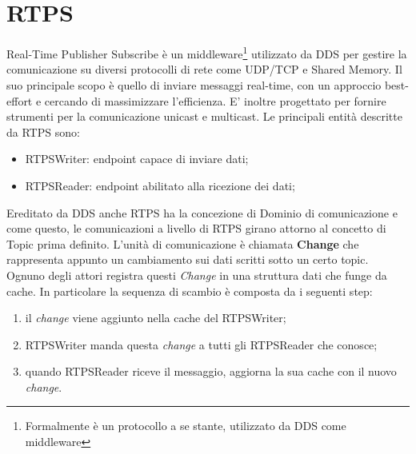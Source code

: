 \section{RTPS}\label{sec:rtps}
Real-Time Publisher Subscribe è un middleware\footnote{Formalmente è un protocollo a se stante, utilizzato da DDS come middleware} utilizzato da DDS per gestire la comunicazione su diversi protocolli di rete come UDP/TCP e Shared Memory. Il suo principale scopo è quello di inviare messaggi real-time, con un approccio best-effort e cercando di massimizzare l'efficienza. E' inoltre progettato per fornire strumenti per la comunicazione unicast e multicast. Le principali entità descritte da RTPS sono:
\begin{itemize}
    \item RTPSWriter: endpoint capace di inviare dati;
    \item RTPSReader: endpoint abilitato alla ricezione dei dati;
\end{itemize}
Ereditato da DDS anche RTPS ha la concezione di Dominio di comunicazione e come questo, le comunicazioni a livello di RTPS girano attorno al concetto di Topic prima definito. L'unità di comunicazione è chiamata \textbf{Change} che rappresenta appunto un cambiamento sui dati scritti sotto un certo topic. Ognuno degli attori registra questi \emph{Change} in una struttura dati che funge da cache.
In particolare la sequenza di scambio è composta da i seguenti step:
\begin{enumerate}
    \item il \emph{change} viene aggiunto nella cache del RTPSWriter;
    \item RTPSWriter manda questa \emph{change} a tutti gli RTPSReader che conosce;
    \item quando RTPSReader riceve il messaggio, aggiorna la sua cache con il nuovo \emph{change}.
\end{enumerate}

